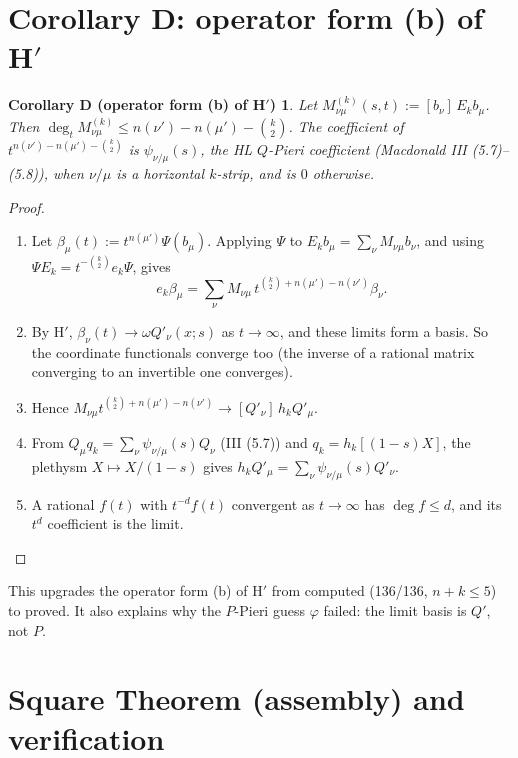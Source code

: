 \documentclass[11pt]{article}
\newtheorem*{corD}{Corollary D (operator form (b) of H$'$)}
\theoremstyle{definition}
\begin{document}
\section{\texorpdfstring{Corollary D: operator form (b) of H$'$}{Corollary D: operator form (b) of H'}}

\begin{corD}
Let $M^{(k)}_{\nu\mu}(s,t):=[b_\nu]\,E_kb_\mu$. Then $\deg_tM^{(k)}_{\nu\mu}\le n(\nu')-n(\mu')-\binom k2$. The coefficient of $t^{n(\nu')-n(\mu')-\binom k2}$ is $\psi_{\nu/\mu}(s)$, the HL $Q$-Pieri coefficient (Macdonald III (5.7)--(5.8)), when $\nu/\mu$ is a horizontal $k$-strip, and is $0$ otherwise.
\end{corD}
\begin{proof}
\begin{enumerate}[nosep]
\item Let $\beta_\mu(t):=t^{n(\mu')}\Psi(b_\mu)$. Applying $\Psi$ to $E_kb_\mu=\sum_\nu M_{\nu\mu}b_\nu$, and using $\Psi E_k=t^{-\binom k2}e_k\Psi$, gives
\[e_k\beta_\mu=\sum_\nu M_{\nu\mu}\,t^{\binom k2+n(\mu')-n(\nu')}\beta_\nu.\]
\item By H$'$, $\beta_\nu(t)\to\omega Q'_\nu(x;s)$ as $t\to\infty$, and these limits form a basis. So the coordinate functionals converge too (the inverse of a rational matrix converging to an invertible one converges).
\item Hence $M_{\nu\mu}t^{\binom k2+n(\mu')-n(\nu')}\to[Q'_\nu]\,h_kQ'_\mu$.
\item From $Q_\mu q_k=\sum_\nu\psi_{\nu/\mu}(s)Q_\nu$ (III (5.7)) and $q_k=h_k[(1-s)X]$, the plethysm $X\mapsto X/(1-s)$ gives $h_kQ'_\mu=\sum_\nu\psi_{\nu/\mu}(s)Q'_\nu$.
\item A rational $f(t)$ with $t^{-d}f(t)$ convergent as $t\to\infty$ has $\deg f\le d$, and its $t^d$ coefficient is the limit.\qedhere
\end{enumerate}
\end{proof}
This upgrades the operator form (b) of H$'$ from computed (136/136, $n+k\le5$) to proved. It also explains why the $P$-Pieri guess $\varphi$ failed: the limit basis is $Q'$, not $P$.

\section{Square Theorem (assembly) and verification}
\end{document}
